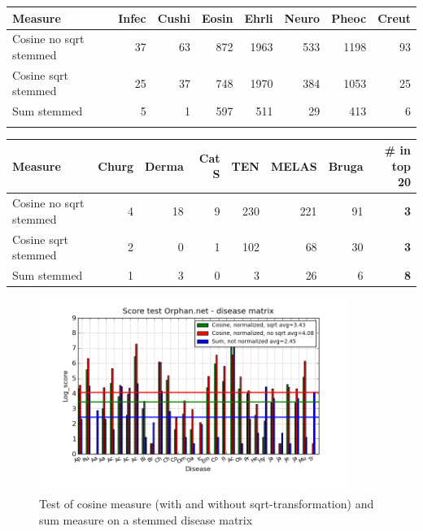 \begin{table}[H]
  \begin{tiny}
  \label{testResult}
  \begin{tabular}{|l|r|r|r|r|r|r|r|}
    \hline
    Measure &Infec&Cushi&Eosin&Ehrli&Neuro&Pheoc&Creut \\
    \hline
    Cosine no sqrt stemmed &37&63&872&1963&533&1198&93 \\
    \hline
    Cosine sqrt stemmed &25&37&748&1970&384&1053&25 \\
    \hline
    Sum stemmed &5&1&597&511&29&413&6 \\
    \hline
  \multicolumn{8}{c}{} \\
  \end{tabular}
  \begin{tabular}{|l|r|r|r|r|r|r|r|}
    \hline
    Measure &Churg&Derma&Cat S&TEN&MELAS&Bruga& \scriptsize{\textbf{\# in top 20}} \\
    \hline
    Cosine no sqrt stemmed &4&18&9&230&221&91 &\scriptsize{\textbf{3}} \\
    \hline
    Cosine sqrt stemmed &2&0&1&102&68&30 &  \scriptsize{\textbf{3}}\\
    \hline
    Sum stemmed &1&3&0&3&26&6 & \scriptsize{\textbf{8}} \\
    \hline
  \end{tabular}
  \end{tiny}
\end{table}

\begin{figure}[H]
        \begin{center}
          \includegraphics[width=0.9\textwidth]{barcharts/diseaseMatrix_orphan_hist_NOTnorm_3000_s_cos_sqrt_cos_sum_nn.png}
        \end{center}
        \caption{Test of cosine measure (with and without sqrt-transformation) and sum measure on a stemmed disease matrix}
        \label{diseaseMatrix_orphan_hist_NOTnorm_3000_s_cos_sqrt_cos_sum_nn}
\end{figure}

